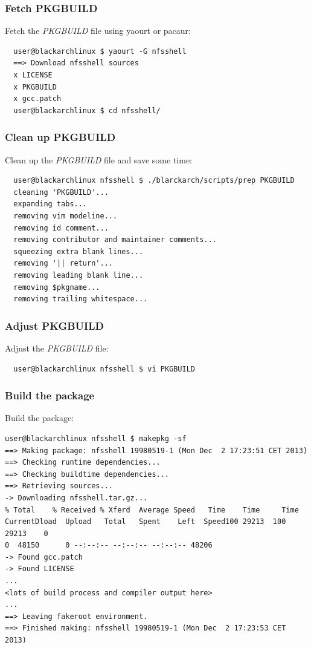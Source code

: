 \documentclass[a4paper, oneside, 11pt]{book}
\begin{document}
\subsubsection{Fetch PKGBUILD}
Fetch the \textit{PKGBUILD} file using yaourt or pacaur:
\begin{lstlisting}
  user@blackarchlinux $ yaourt -G nfsshell
  ==> Download nfsshell sources
  x LICENSE
  x PKGBUILD
  x gcc.patch
  user@blackarchlinux $ cd nfsshell/
\end{lstlisting}

\subsubsection{Clean up PKGBUILD}
Clean up the \textit{PKGBUILD} file and save some time:
\begin{lstlisting}
  user@blackarchlinux nfsshell $ ./blarckarch/scripts/prep PKGBUILD
  cleaning 'PKGBUILD'...
  expanding tabs...
  removing vim modeline...
  removing id comment...
  removing contributor and maintainer comments...
  squeezing extra blank lines...
  removing '|| return'...
  removing leading blank line...
  removing $pkgname...
  removing trailing whitespace...
\end{lstlisting}

\subsubsection{Adjust PKGBUILD}
Adjust the \textit{PKGBUILD} file:
\begin{lstlisting}
  user@blackarchlinux nfsshell $ vi PKGBUILD
\end{lstlisting}

\subsubsection{Build the package}
Build the package:
\begin{lstlisting}user@blackarchlinux nfsshell $ makepkg -sf
==> Making package: nfsshell 19980519-1 (Mon Dec  2 17:23:51 CET 2013)
==> Checking runtime dependencies...
==> Checking buildtime dependencies...
==> Retrieving sources...
-> Downloading nfsshell.tar.gz...
% Total    % Received % Xferd  Average Speed   Time    Time     Time
CurrentDload  Upload   Total   Spent    Left  Speed100 29213  100 29213    0
0  48150      0 --:--:-- --:--:-- --:--:-- 48206
-> Found gcc.patch
-> Found LICENSE
...
<lots of build process and compiler output here>
...
==> Leaving fakeroot environment.
==> Finished making: nfsshell 19980519-1 (Mon Dec  2 17:23:53 CET 2013)
\end{lstlisting}
\end{document}
